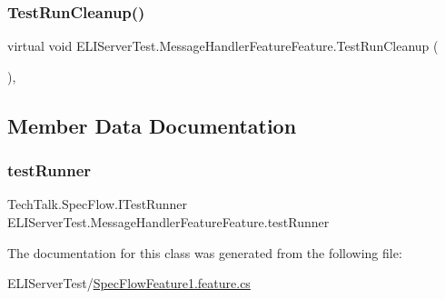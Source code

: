 \subsubsection{\texorpdfstring{Test\+Run\+Cleanup()}{TestRunCleanup()}}
{\footnotesize\ttfamily virtual void E\+L\+I\+Server\+Test.\+Message\+Handler\+Feature\+Feature.\+Test\+Run\+Cleanup (\begin{DoxyParamCaption}{ }\end{DoxyParamCaption})\hspace{0.3cm}{\ttfamily [inline]}, {\ttfamily [virtual]}}



\subsection{Member Data Documentation}
\mbox{\label{class_e_l_i_server_test_1_1_message_handler_feature_feature_a44767e763fb63366241c69133ede800f}} 
\subsubsection{\texorpdfstring{test\+Runner}{testRunner}}
{\footnotesize\ttfamily Tech\+Talk.\+Spec\+Flow.\+I\+Test\+Runner E\+L\+I\+Server\+Test.\+Message\+Handler\+Feature\+Feature.\+test\+Runner\hspace{0.3cm}{\ttfamily [private]}}



The documentation for this class was generated from the following file\+:\begin{DoxyCompactItemize}
\item 
E\+L\+I\+Server\+Test/\hyperlink{_spec_flow_feature1_8feature_8cs}{Spec\+Flow\+Feature1.\+feature.\+cs}\end{DoxyCompactItemize}
